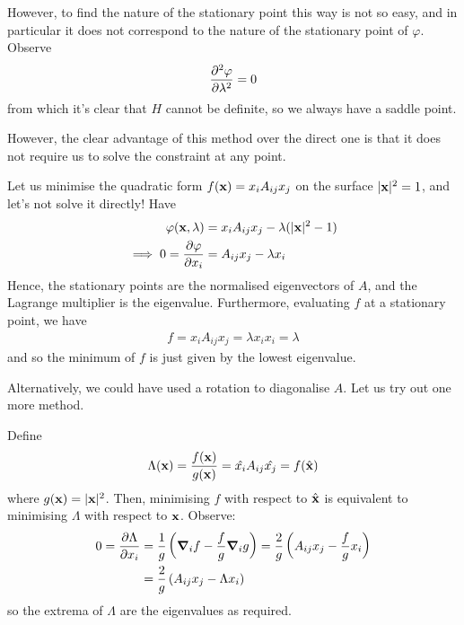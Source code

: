 \documentclass{../template/note}
\begin{document}
    However, to find the nature of the stationary point this way is not so easy, and in particular it does not correspond to the nature of the stationary point of $\varphi$. Observe
    \begin{align*}
        \pd{^2\varphi}{\lambda^2} = 0
    \end{align*}
    from which it's clear that $H$ cannot be definite, so we always have a saddle point.

    However, the clear advantage of this method over the direct one is that it does not require us to solve the constraint at any point.
    
    \begin{example*}
        Let us minimise the quadratic form $f(\V x) = x_iA_{ij}x_j$ on the surface $|\V x|^2 = 1$, and let's not solve it directly! Have
        \begin{align*}
            \varphi(\V x, \lambda) &= x_i A_{ij} x_j - \lambda(|\V x|^2 - 1) \\
            \implies 0 = \pd{\varphi}{x_i} &= A_{ij} x_j - \lambda x_i
        \end{align*}
        Hence, the stationary points are the normalised eigenvectors of $A$, and the Lagrange multiplier is the eigenvalue. Furthermore, evaluating $f$ at a stationary point, we have
        \begin{align*}
            f = x_i A_{ij} x_j = \lambda x_i x_i = \lambda
        \end{align*}
        and so the minimum of $f$ is just given by the lowest eigenvalue.
    \end{example*}
    
    Alternatively, we could have used a rotation to diagonalise $A$. Let us try out one more method.
    
    \begin{example*}
        Define
        \begin{align*}
            \Lambda(\V x) = \frac{f(\V x)}{g(\V x)} = \hat{x_i} A_{ij} \hat{x_j} = f(\hvec x)
        \end{align*}
        where $g(\V x) = |\V x|^2$. Then, minimising $f$ with respect to $\hvec x$ is equivalent to minimising $\Lambda$ with respect to $\V x$. Observe:
        \begin{align*}
            0 = \pd{\Lambda}{x_i} &= \frac 1 g \left(\grad_i f - \frac f g \grad_i g\right) = \frac 2 g \left(A_{ij} x_j - \frac f g x_i\right) \\
            &= \frac 2 g \left(A_{ij}x_j - \Lambda x_i\right)
        \end{align*}
        so the extrema of $\Lambda$ are the eigenvalues as required.
    \end{example*}
    
\end{document}
